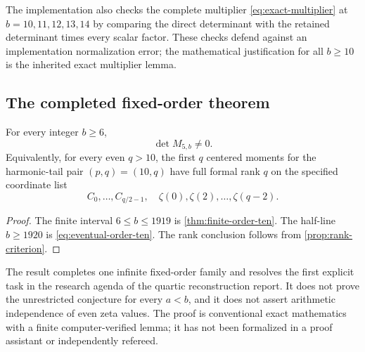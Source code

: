 The implementation also checks the complete multiplier
\eqref{eq:exact-multiplier} at $b=10,11,12,13,14$ by comparing the
direct determinant with the retained determinant times every scalar
factor.  These checks defend against an implementation normalization
error; the mathematical justification for all $b\ge10$ is the inherited
exact multiplier lemma.

\subsection{The completed fixed-order theorem}

\begin{theorem}
\label{thm:complete-order-ten}
For every integer $b\ge6$,
\begin{equation}
 \boxed{\det M_{5,b}\ne0.}
 \label{eq:complete-order-ten}
\end{equation}
Equivalently, for every even $q>10$, the first $q$ centered moments for
the harmonic-tail pair $(p,q)=(10,q)$ have full formal rank $q$ on the
specified coordinate list
\[
 C_0,\ldots,C_{q/2-1},\quad
 \zeta(0),\zeta(2),\ldots,\zeta(q-2).
\]
\end{theorem}

\begin{proof}
The finite interval $6\le b\le1919$ is
\cref{thm:finite-order-ten}.  The half-line $b\ge1920$ is
\eqref{eq:eventual-order-ten}.  The rank conclusion follows from
\cref{prop:rank-criterion}.
\end{proof}

\begin{remark}
The result completes one infinite fixed-order family and resolves the
first explicit task in the research agenda of the quartic reconstruction
report.  It does not prove the unrestricted conjecture for every
$a<b$, and it does not assert arithmetic independence of even zeta
values.  The proof is conventional exact mathematics with a finite
computer-verified lemma; it has not been formalized in a proof assistant
or independently refereed.
\end{remark}
